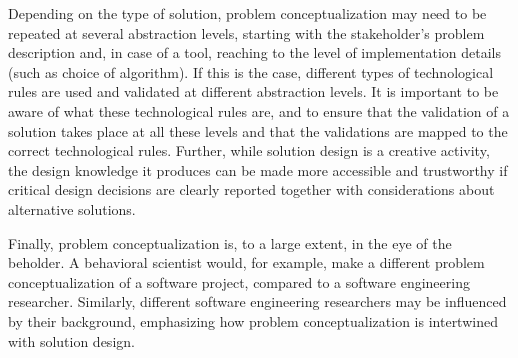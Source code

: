 \documentclass[graybox]{svmult}
\newcommand{\emelie}[1]{\textcolor{red}{{\it [Emelie says: #1]}}}
\newcommand{\peggy}[1]{\textcolor{blue}{{\it [Peggy says: #1]}}}
\newcommand{\per}[1]{\textcolor{cyan}{{\it [Per says: #1]}}}
\newcommand{\emelie}[1]{}
\newcommand{\peggy}[1]{}
\newcommand{\per}[1]{}
\begin{document}
Depending on the type of solution, problem conceptualization may need to be repeated at several abstraction levels, starting with the stakeholder's problem description and, in case of a tool, reaching to the level of implementation details (such as choice of algorithm). If this is the case, different types of technological rules are used and validated at different abstraction levels. It is important to be aware of what these technological rules are, and to ensure that the validation of a solution takes place at all these levels and that the validations are mapped to the correct technological rules. Further, while solution design is a creative activity, the design knowledge it produces can be made more accessible and trustworthy if critical design decisions are clearly reported together with considerations about alternative solutions.

Finally, problem conceptualization is, to a large extent, in the eye of the beholder. A behavioral scientist would, for example, make a different problem conceptualization of a software project, compared to a software engineering researcher. Similarly, different software engineering researchers may be influenced by their background, emphasizing how problem conceptualization is intertwined with solution design.%


\end{document}
